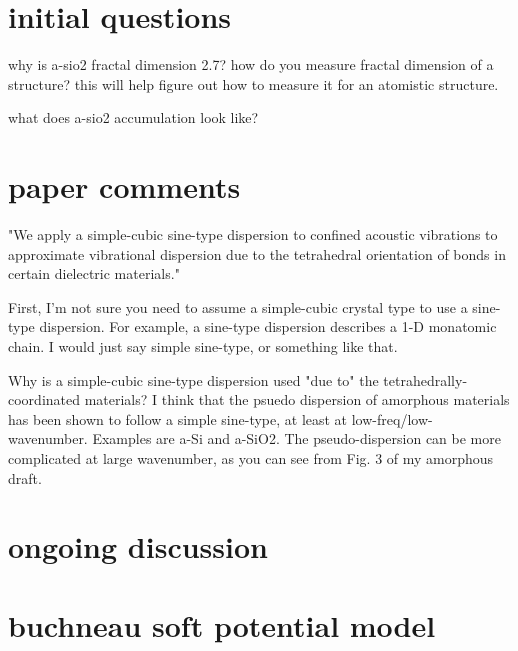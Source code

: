 \documentclass{article}
\begin{document}
\section{initial questions}
why is a-sio2 fractal dimension 2.7? how do you measure fractal dimension 
of a structure? this will help figure out how to measure it for an 
atomistic structure.

what does a-sio2 accumulation look like?

\section{paper comments}
"We apply a simple-cubic sine-type dispersion to confined acoustic 
vibrations to approximate vibrational dispersion due to the tetrahedral 
orientation of bonds in certain dielectric materials."

First, I'm not sure you need to assume a simple-cubic crystal type to 
use a sine-type dispersion. For example, a sine-type dispersion describes 
a 1-D monatomic chain. I would just say simple sine-type, or something 
like that.

Why is a simple-cubic sine-type dispersion used "due to" the 
tetrahedrally-coordinated materials? I think  that the psuedo dispersion 
of amorphous materials has been shown to follow a simple sine-type, at 
least at low-freq/low-wavenumber.  Examples are a-Si and a-SiO2. The 
pseudo-dispersion can be more complicated at large wavenumber, 
as you can see from Fig. 3 of my amorphous draft.


\section{ongoing discussion}

\section{buchneau soft potential model}
\cite{buchneau_interaction_1992}
\end{document}
